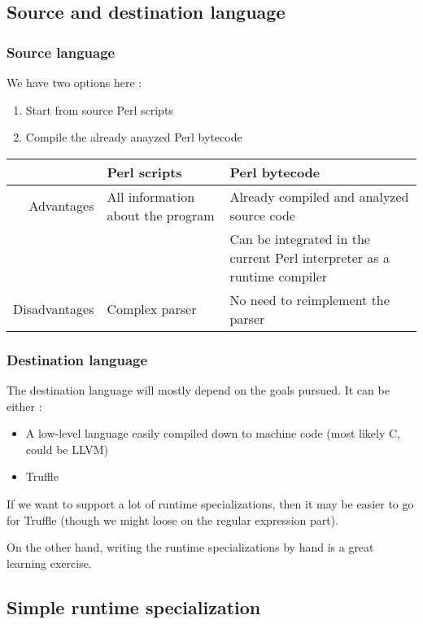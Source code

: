 \documentclass[11pt,a4paper]{article}
\newcommand{\pgl}[1]{\textsf{#1}}
\begin{document}
\subsection{Source and destination language}

\subsubsection{Source language}

We have two options here :
\begin{enumerate}
\item Start from source Perl scripts
\item Compile the already anayzed Perl bytecode
\end{enumerate}

\begin{tabular}{|r|l|l|}
\hline
	& Perl scripts	& Perl bytecode \\
\hline
Advantages	& All information about the program	& Already compiled and analyzed source code \\
	&	& Can be integrated in the current Perl interpreter as a runtime compiler \\
\hline
Disadvantages	& Complex parser	& No need to reimplement the parser \\
\hline
\end{tabular}

\subsubsection{Destination language}

The destination language will mostly depend on the goals pursued. It can be either :
\begin{itemize}
\item A low-level language easily compiled down to machine code (most likely \pgl{C}, could be \pgl{LLVM})
\item Truffle
\end{itemize}

If we want to support a lot of runtime specializations, then it may be easier to go for Truffle (though we might loose on the regular expression part).

On the other hand, writing the runtime specializations by hand is a great learning exercise.

\subsection{Simple runtime specialization}
\end{document}
